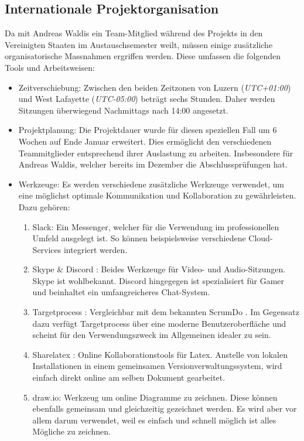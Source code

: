 \subsection{Internationale Projektorganisation}
\label{subsec:international}
Da mit Andreas Waldis ein Team-Mitglied während des Projekts in den Vereinigten Staaten im Austauschsemester weilt, müssen einige zusätzliche organisatorische Massnahmen ergriffen werden. Diese umfassen die folgenden Tools und Arbeitsweisen:
\begin{itemize}
\item Zeitverschiebung: Zwischen den beiden Zeitzonen von Luzern (\textit{UTC+01:00}) und West Lafayette (\textit{UTC-05:00}) beträgt sechs Stunden. Daher werden Sitzungen überwiegend Nachmittags nach 14:00 angesetzt. 
\item Projektplanung: Die Projektdauer wurde für diesen speziellen Fall um 6 Wochen auf Ende Januar erweitert. Dies ermöglicht den verschiedenen Teammitglieder entsprechend ihrer Auslastung zu arbeiten. Insbesondere für Andreas Waldis, welcher bereits im Dezember die Abschlussprüfungen hat. 
\item Werkzeuge: Es werden verschiedene zusätzliche Werkzeuge verwendet, um eine möglichst optimale Kommunikation und Kollaboration zu gewährleisten. Dazu gehören:
\begin{enumerate}
\item Slack: Ein Messenger, welcher für die Verwendung im professionellen Umfeld ausgelegt ist. So können beispielsweise verschiedene Cloud-Services integriert werden.\cite{SlackBel4:online}
\item Skype \& Discord \cite{DiscordF75:online}\cite{SkypeKos72:online}: Beides Werkzeuge für Video- und Audio-Sitzungen. Skype ist wohlbekannt. Discord hingegegen ist spezialisiert für Gamer und beinhaltet ein umfangreicheres Chat-System.
\item Targetprocess \cite{targetprocess}: Vergleichbar mit dem bekannten ScrumDo \cite{scrumdo}. Im Gegensatz dazu verfügt Targetprocess über eine moderne Benutzeroberfläche und scheint für den Verwendungszweck im Allgemeinen idealer zu sein.
\item Sharelatex \cite{sharelatex}: Online Kollaborationstools für Latex. Anstelle von lokalen Installationen in einem gemeinsamen Versionverwaltungssystem, wird einfach direkt online am selben Dokument gearbeitet.
\item draw.io\cite{draw:io}: Werkzeug um online Diagramme zu zeichnen. Diese können ebenfalls gemeinsam und gleichzeitig gezeichnet werden. Es wird aber vor allem darum verwendet, weil es einfach und schnell möglich ist alles Mögliche zu zeichnen.
\end{enumerate}
\end{itemize}

